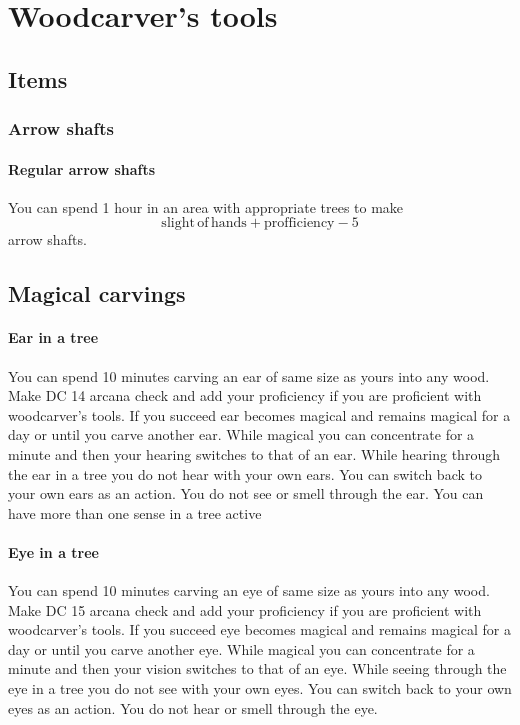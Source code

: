 \chapter{Woodcarver's tools}

\section{Items}

\subsection{Arrow shafts}

\subsubsection{Regular arrow shafts}

You can spend 1 hour in an area with appropriate trees to make $$\mathrm{slight\,of\,hands} + \mathrm{profficiency} - 5$$ arrow shafts.

\section{Magical carvings}

\subsubsection{Ear in a tree}

You can spend 10 minutes carving an ear of same size as yours into any wood. Make DC 14 arcana check and add your proficiency if you are proficient with woodcarver's tools. If you succeed ear becomes magical and remains magical for a day or until you carve another ear. While magical you can concentrate for a minute and then your hearing switches to that of an ear. While hearing through the ear in a tree you do not hear with your own ears. You can switch back to your own ears as an action. You do not see or smell through the ear. You can have more than one sense in a tree active

\subsubsection{Eye in a tree}

You can spend 10 minutes carving an eye of same size as yours into any wood. Make DC 15 arcana check and add your proficiency if you are proficient with woodcarver's tools. If you succeed eye becomes magical and remains magical for a day or until you carve another eye. While magical you can concentrate for a minute and then your vision switches to that of an eye. While seeing through the eye in a tree you do not see with your own eyes. You can switch back to your own eyes as an action. You do not hear or smell through the eye.

